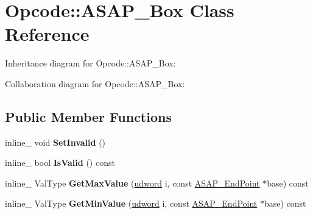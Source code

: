 \hypertarget{class_opcode_1_1_a_s_a_p___box}{\section{Opcode\+:\+:A\+S\+A\+P\+\_\+\+Box Class Reference}
\label{class_opcode_1_1_a_s_a_p___box}
}


Inheritance diagram for Opcode\+:\+:A\+S\+A\+P\+\_\+\+Box\+:


Collaboration diagram for Opcode\+:\+:A\+S\+A\+P\+\_\+\+Box\+:
\subsection*{Public Member Functions}
\begin{DoxyCompactItemize}
\item 
\hypertarget{class_opcode_1_1_a_s_a_p___box_af4694c73cfe21e3909c5ebd37e0f6a9b}{inline\+\_\+ void {\bfseries Set\+Invalid} ()}\label{class_opcode_1_1_a_s_a_p___box_af4694c73cfe21e3909c5ebd37e0f6a9b}

\item 
\hypertarget{class_opcode_1_1_a_s_a_p___box_aa6ac46589d396f5e42c5e885827f351a}{inline\+\_\+ bool {\bfseries Is\+Valid} () const }\label{class_opcode_1_1_a_s_a_p___box_aa6ac46589d396f5e42c5e885827f351a}

\item 
\hypertarget{class_opcode_1_1_a_s_a_p___box_aba1eaa030e17117d48e45eb719ffe50d}{inline\+\_\+ Val\+Type {\bfseries Get\+Max\+Value} (\hyperlink{_ice_types_8h_a44c6f1920ba5551225fb534f9d1a1733}{udword} i, const \hyperlink{class_opcode_1_1_a_s_a_p___end_point}{A\+S\+A\+P\+\_\+\+End\+Point} $\ast$base) const }\label{class_opcode_1_1_a_s_a_p___box_aba1eaa030e17117d48e45eb719ffe50d}

\item 
\hypertarget{class_opcode_1_1_a_s_a_p___box_abc83a1f986a050fd70c473eb4b2ae809}{inline\+\_\+ Val\+Type {\bfseries Get\+Min\+Value} (\hyperlink{_ice_types_8h_a44c6f1920ba5551225fb534f9d1a1733}{udword} i, const \hyperlink{class_opcode_1_1_a_s_a_p___end_point}{A\+S\+A\+P\+\_\+\+End\+Point} $\ast$base) const }\label{class_opcode_1_1_a_s_a_p___box_abc83a1f986a050fd70c473eb4b2ae809}

\end{DoxyCompactItemize}
